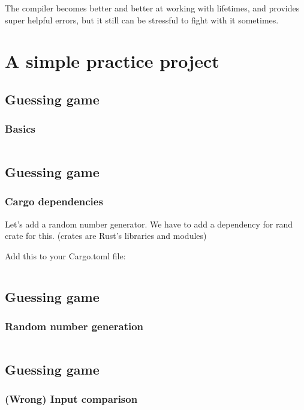\documentclass[usenames,twocolumn,dvipsnames,10pt,a4wide]{article}
\begin{document}
The compiler becomes better and better at working
with lifetimes, and provides super helpful errors,
but it still can be stressful to fight with it
sometimes.


\section{A simple practice project}

\subsection{Guessing game}
	\subsubsection{Basics}
	\inputminted[fontsize=\footnotesize]{rust}{code/guess1.rs}
	


\subsection{Guessing game}
	\subsubsection{Cargo dependencies}
	Let's add a random number generator. We have
	to add a dependency for rand crate for this.
	(crates are Rust's libraries and modules)
	

	Add this to your Cargo.toml file:
	
	\inputminted[fontsize=\normalsize]{toml}{code/toml1.toml}


\subsection{Guessing game}
	\subsubsection{Random number generation}
	\inputminted[fontsize=\footnotesize]{rust}{code/guess2.rs}


\subsection{Guessing game}
	\subsubsection{(Wrong) Input comparison}
	\inputminted[fontsize=\normalsize]{rust}{code/guess3.rs}
\end{document}
